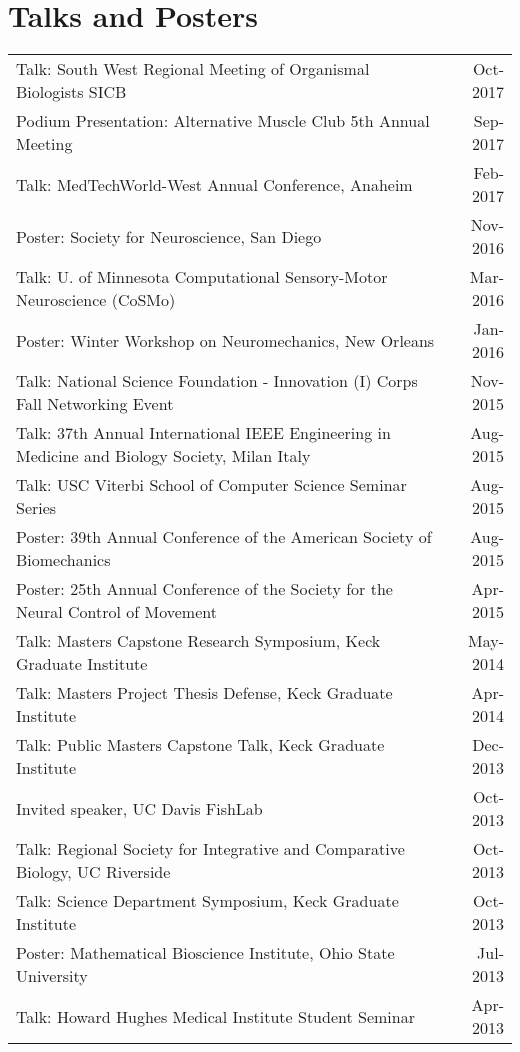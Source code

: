 \documentclass[10pt,a4paper]{article}
\begin{document}
  \vspace*{2mm}\section*{Talks and Posters}

  \vspace*{1mm}\noindent\begin{tabularx}{17cm}{X r}
	Talk: South West Regional Meeting of Organismal Biologists SICB & Oct-2017 \\
    Podium Presentation: Alternative Muscle Club 5th Annual Meeting & Sep-2017 \\
    Talk: MedTechWorld-West Annual Conference, Anaheim & Feb-2017\\
    Poster: Society for Neuroscience, San Diego & Nov-2016 \\ 
    Talk: U. of Minnesota Computational Sensory-Motor Neuroscience (CoSMo)& Mar-2016 \\
    Poster: Winter Workshop on Neuromechanics, New Orleans & Jan-2016 \\ %
      Talk: National Science Foundation - Innovation (I) Corps Fall Networking Event & Nov-2015\\
    Talk: 37th Annual International IEEE Engineering in Medicine and Biology Society, Milan Italy & Aug-2015 \\
    Talk: USC Viterbi School of Computer Science Seminar Series & Aug-2015 \\
    Poster: 39th Annual Conference of the American Society of Biomechanics & Aug-2015 \\
    Poster: 25th Annual Conference of the Society for the Neural Control of Movement & Apr-2015 \\
    Talk: Masters Capstone Research Symposium, Keck Graduate Institute & May-2014 \\
    Talk: Masters Project Thesis Defense, Keck Graduate Institute & Apr-2014 \\
    Talk: Public Masters Capstone Talk, Keck Graduate Institute & Dec-2013 \\
    Invited speaker, UC Davis FishLab & Oct-2013 \\
    Talk: Regional Society for Integrative and Comparative Biology, UC Riverside & Oct-2013 \\
    Talk: Science Department Symposium, Keck Graduate Institute & Oct-2013 \\
    Poster: Mathematical Bioscience Institute, Ohio State University & Jul-2013\\
    Talk: Howard Hughes Medical Institute Student Seminar & Apr-2013 \\
  \end{tabularx}
\end{document}
